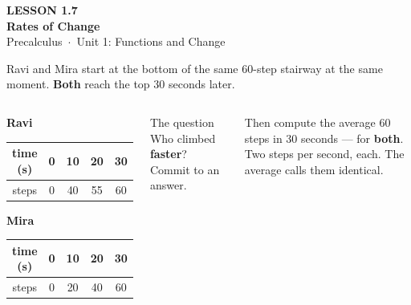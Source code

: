 \documentclass[aspectratio=169, 11pt]{beamer}
\begin{document}
{
\begin{frame}[plain]
  \vspace{2.8cm}\hspace{0.55cm}%
  \begin{minipage}{0.9\textwidth}
    {\color{goldacc}\bfseries\small LESSON 1.7}\\[0.5cm]
    {\color{white}\bfseries\LARGE Rates of Change}\\[1.2cm]
    {\color{lilacmid}\small Precalculus~$\cdot$~Unit 1: Functions and Change}
  \end{minipage}
\end{frame}
}

\begin{frame}[t, plain]

  Ravi and Mira start at the bottom of the same 60-step stairway at the same
  moment. \textbf{Both} reach the top 30 seconds later.

  \smallskip
  \begin{columns}[T]
      \begin{center}
      \textbf{Ravi}

      \smallskip
      \begin{tabular}{|c|c|c|c|c|}
      \hline
      time (s) & 0 & 10 & 20 & 30 \\
      \hline
      steps & 0 & 40 & 55 & 60 \\
      \hline
      \end{tabular}

      \medskip
      \textbf{Mira}

      \smallskip
      \begin{tabular}{|c|c|c|c|c|}
      \hline
      time (s) & 0 & 10 & 20 & 30 \\
      \hline
      steps & 0 & 20 & 40 & 60 \\
      \hline
      \end{tabular}
      \end{center}

      \begin{block}{The question}
        Who climbed \textbf{faster}? Commit to an answer.
      \end{block}

      \medskip
      \begin{block}{Then compute the average}
        60 steps in 30 seconds --- for \textbf{both}. Two steps per second,
        each. The average calls them identical.
      \end{block}
  \end{columns}
\end{frame}
\end{document}
